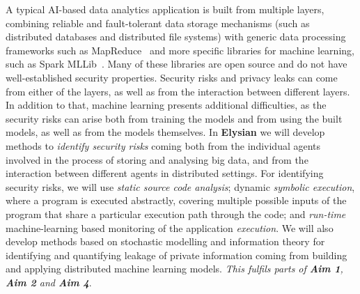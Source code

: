 \documentclass[a4paper,11pt]{article}
\newcommand{\project}[1]{\textbf{#1}\xspace}
\newcommand{\SECURITY}{\project{Elysian}}
\newcommand{\TheProject}{\SECURITY}
\begin{document}
A typical AI-based data analytics application is built from multiple layers, combining reliable and fault-tolerant data storage mechanisms (such as distributed databases and distributed file systems) with generic data processing frameworks such as MapReduce~\cite{mapreduce} and more specific libraries for machine learning, such as Spark MLLib~\cite{mllib}. Many of these libraries are open source and do not have well-established security properties. Security risks and privacy leaks can come from either of the layers, as well as from the interaction between different layers. In addition to that, machine learning presents additional difficulties, as the security risks can arise both from training the models and from using the built models, as well as from the models themselves. In \TheProject{}  we will develop methods to \emph{identify security risks} coming both from the individual agents involved in the process of storing and analysing big data, and from the interaction between different agents in distributed settings. For identifying security risks, we will use \emph{static source code analysis}; dynamic \emph{symbolic execution}, where a program is executed abstractly, covering multiple possible inputs of the program that share a particular execution path through the code; and \emph{run-time} machine-learning based monitoring of the application \emph{execution}. We will also develop methods based on stochastic modelling and information theory for identifying and quantifying leakage of private information coming from building and applying distributed machine learning models. \emph{This fulfils parts of \textbf{Aim 1}, \textbf{Aim 2} and \textbf{Aim 4}}.
\end{document}
